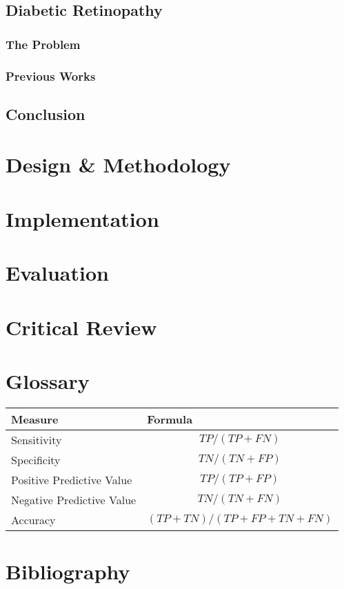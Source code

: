 \documentclass[a4paper,12pt]{article}
\begin{document}
\paragraph{}
\subsection{Diabetic Retinopathy}
\subsubsection{The Problem}
\paragraph{}
\subsubsection{Previous Works}
\paragraph{}
\subsection{Conclusion}
\paragraph{}
\newpage
\section{Design \& Methodology}

\newpage
\section{Implementation}

\newpage
\section{Evaluation}

\newpage
\section{Critical Review}

\newpage
\section{Glossary}
\begin{tabular}{ll}
\hline
Measure & Formula\\
\hline
Sensitivity & $$TP/(TP + FN)$$\\
Specificity & $$TN/(TN + FP)$$\\
Positive Predictive Value & $$TP/(TP + FP)$$\\
Negative Predictive Value & $$TN/(TN + FN)$$\\
Accuracy & $$(TP + TN)/(TP + FP + TN + FN)$$\\
\hline
\end{tabular}
\newpage
\section{Bibliography}
\end{document}
